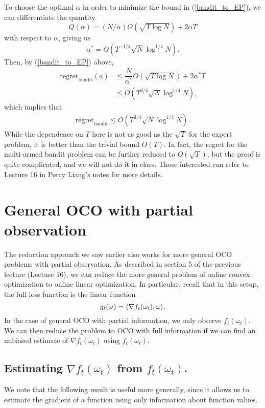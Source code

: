 \documentclass[11pt]{article}
\begin{document}
To choose the optimal $\alpha$ in order to minimize the bound in (\ref{bandit_to_EP}), we can differentiate the quantity
$$Q(\alpha) = (N/\alpha) O(\sqrt{T \log N}) + 2\alpha T$$ 
with respect to $\alpha$, giving us 
$$\alpha^* = O(T^{-1/4} \sqrt{N} \log^{1/4}N).$$ Then, by (\ref{bandit_to_EP}) above,
\begin{align*}
    \text{regret}_{\text{bandit}}(a) &\leq \dfrac{N}{\alpha^*} O(\sqrt{T \log N}) + 2\alpha^* T \\
    &\leq O(T^{3/4} \sqrt{N} \log^{1/4}N),
\end{align*}
which implies that
\begin{gather*}
    \text{regret}_{\text{bandit}} \leq O(T^{3/4} \sqrt{N} \log^{1/4}N).
\end{gather*}
While the dependence on $T$ here is not as good as the $\sqrt{T}$ for the expert problem, it is better than the trivial bound $O(T)$. In fact, the regret for the multi-armed bandit problem can be further reduced to $O(\sqrt{T})$, but the proof is quite complicated, and we will not do it in class. Those interested can refer to Lecture 16 in Percy Liang's notes for more details.

\section{General OCO with partial observation}

The reduction approach we saw earlier also works for more general OCO problems with partial observation. As described in section 5 of the previous lecture (Lecture 16), we can reduce the more general problem of online convex optimization to online linear optimization. In particular, recall that in this setup, the full loss function is the linear function 
$$g_t(\omega) = \langle\nabla f_t(\omega_t), \omega\rangle.$$ 
In the case of general OCO with partial information, we only observe $f_t(\omega_t)$. We can then reduce the problem to OCO with full information if we can find an unbiased estimate of $\nabla f_t(\omega_t)$ using $f_t(\omega_t)$.

\subsection{Estimating $\nabla f_t(\omega_t)$ from $f_t(\omega_t)$.} 
We note that the following result is useful more generally, since it allows us to estimate the gradient of a function using only information about function values.
\end{document}

